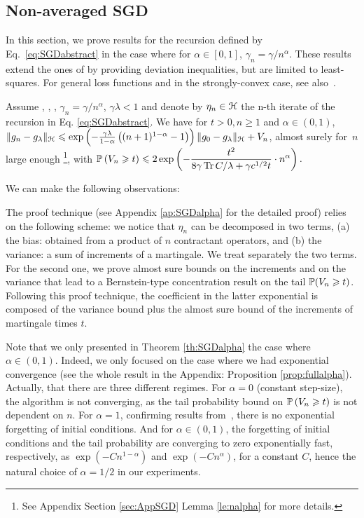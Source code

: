 \subsection{Non-averaged SGD}

In this section, we prove results for the recursion defined by Eq.~\eqref{eq:SGDabstract} in the case where for $\alpha \in [0,1]$, $ \gamma_n = \gamma/n^\alpha$. These results extend the ones of \citet{gradsto} by providing deviation inequalities, but are limited to least-squares. For general loss functions and in the strongly-convex case, see also~\citet{kakade2009generalization}.

\begin{theorem}[SGD, decreasing step size: $\gamma_n = \gamma/n^\alpha$] \label{th:SGDalpha}
Assume , , , $\gamma_n = \gamma/n^\alpha$, $\gamma\lambda < 1$ and denote by $\eta_n \in \H$ the n-th iterate of the recursion in Eq. \eqref{eq:SGDabstract}. We have for $t > 0, n \geqslant 1$ and  $\alpha \in (0,1)$, $\|g_n - g_\lambda\|_\H \leqslant \exp\left(  -\frac{\gamma\lambda}{1-\alpha}\left( (n+1)^{1-\alpha} -1  \right)   \right) \|g_0 - g_\lambda\|_\H + V_n$, almost surely for~$n$ large enough \footnote {See Appendix Section \ref{sec:AppSGD} Lemma \ref{le:nalpha} for more details.}, with
$\displaystyle \P \left( V_n \geqslant t \right) \leqslant 2\exp\left( -\frac{ t^2 }{ 8 \gamma \tr C/\lambda  + \gamma c^{1/2}t }\cdot n^{\alpha}\right).$
\end{theorem}
%
We can make the following observations: 
\vspace{-0.1cm}
\BIT
\itemsep-3pt
\item The proof technique (see Appendix \ref{ap:SGDalpha} for the detailed proof) relies on the following scheme: we notice that $\eta_n$ can be decomposed in two terms, (a) the bias: obtained from a product of $n$ contractant operators, and (b) the variance: a sum of increments of a martingale. We treat separately the two terms. For the second one, we prove almost sure bounds on the increments and on the variance that lead to a Bernstein-type concentration result on the tail $\P (V_n \geqslant t)$. Following this proof technique, the coefficient in the latter exponential is composed of the variance bound plus the almost sure bound of the increments of martingale times $t$.
%
\item Note that we only presented in Theorem \ref{th:SGDalpha} the case where $\alpha \in (0,1)$. Indeed, we only focused on the case where we had exponential convergence (see the whole result in the Appendix: Proposition \ref{prop:fullalpha}). Actually, that there are three different regimes. For $\alpha=0$ (constant step-size), the algorithm is not converging, as the tail probability bound on $\P \left( V_n \geqslant t \right) $ is not dependent on $n$. For $\alpha=1$, confirming results from~\citet{gradsto}, there is no exponential forgetting of initial conditions. And for $\alpha \in (0,1)$, the forgetting of initial conditions and the tail probability are converging to zero exponentially fast, respectively,  as $\exp( - C n^{1-\alpha})$ and $\exp( - C n^{\alpha})$, for a constant $C$, hence the natural choice of $\alpha=1/2$ in our experiments.

